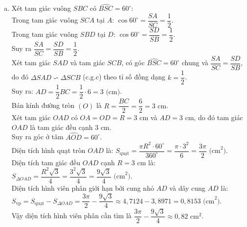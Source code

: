 \begin{bt}
{\begin{enumerate}[a)]
	$\widehat{IAH} = \widehat{IHA} = \widehat{SH A}$.\\
	Mặt khác, tứ giác $HDMC$ nội tiếp (do $\widehat{HDC} = 90^\circ$ và $\widehat{HMC} = 90^\circ$), nên:
	$\widehat{KDC} = \widehat{HDC} - \widehat{HDM} = 90^\circ - \widehat{HDM}$.\\
	Trong tứ giác nội tiếp $SDHM$, ta có $\widehat{HDM} = \widehat{HSM}$. Trong tam giác vuông $SH A$ vuông tại $A$, ta có $\widehat{HSM} = 90^\circ - \widehat{SHA}$.\\
	Từ đó suy ra $\widehat{KDC} = \widehat{SHA} = \widehat{IAH}$.
	\item Xét tam giác vuông $SBC$ có $\widehat{BSC} = 60^\circ$:\\
	Trong tam giác vuông $SCA$ tại $A$: $\cos 60^\circ = \dfrac{SA}{SC} = \dfrac{1}{2}$.\\
	Trong tam giác vuông $SBD$ tại $D$: $\cos 60^\circ = \dfrac{SD}{SB} = \dfrac{1}{2}$.\\
	Suy ra $\dfrac{SA}{SC} = \dfrac{SD}{SB} = \dfrac{1}{2}$.\\
	Xét tam giác $SAD$ và tam giác $SCB$, có góc $\widehat{BSC} = 60^\circ$ chung và $\dfrac{SA}{SC} = \dfrac{SD}{SB}$, do đó $\Delta SAD \backsim \Delta SCB$ (c.g.c) theo tỉ số đồng dạng $k = \dfrac{1}{2}$.\\
	Suy ra: $AD = \dfrac{1}{2} BC = \dfrac{1}{2} \cdot 6 = 3\text{ (cm)}$.\\
	Bán kính đường tròn $(O)$ là $R = \dfrac{BC}{2} = \dfrac{6}{2} = 3\text{ cm}$.\\
	Xét tam giác $OAD$ có $OA = OD = R = 3\text{ cm}$ và $AD = 3\text{ cm}$, do đó tam giác $OAD$ là tam giác đều cạnh $3\text{ cm}$.\\
	Suy ra góc ở tâm $\widehat{AOD} = 60^\circ$.\\
	Diện tích hình quạt tròn $OAD$ là:
	$S_{\text{quạt}} = \dfrac{\pi R^2 \cdot 60^\circ}{360^\circ} = \dfrac{\pi \cdot 3^2}{6} = \dfrac{3\pi}{2}\text{ (cm}^2\text{)}$.\\
	Diện tích tam giác đều $OAD$ cạnh $R = 3\text{ cm}$ là:
	$S_{\Delta OAD} = \dfrac{R^2\sqrt{3}}{4} = \dfrac{3^2\sqrt{3}}{4} = \dfrac{9\sqrt{3}}{4}\text{ (cm}^2\text{)}$.\\
	Diện tích hình viên phân giới hạn bởi cung nhỏ $AD$ và dây cung $AD$ là:
	$S_{\text{vp}} = S_{\text{quạt}} - S_{\Delta OAD} = \dfrac{3\pi}{2} - \dfrac{9\sqrt{3}}{4} \approx 4{,}7124 - 3{,}8971 = 0{,}8153\text{ (cm}^2\text{)}$.\\
	Vậy diện tích hình viên phân cần tìm là $\dfrac{3\pi}{2} - \dfrac{9\sqrt{3}}{4} \approx 0{,}82\text{ cm}^2$.
\end{enumerate}
}
\end{bt}
